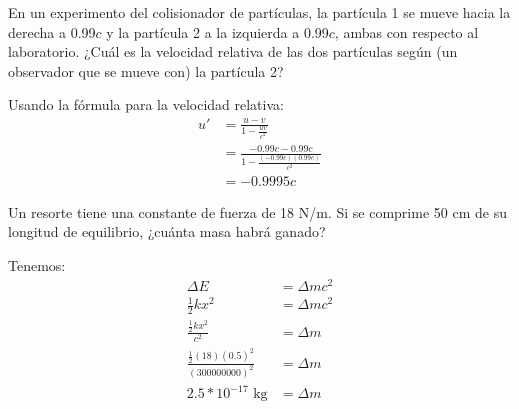 \begin{problema}
    En un experimento del colisionador de partículas, la partícula 1 se mueve hacia la derecha a 0.99$c$ y la partícula 2 a la izquierda a 0.99$c$, ambas con respecto al laboratorio. ¿Cuál es la velocidad relativa de las dos partículas según (un observador que se mueve con) la partícula 2? 
    \begin{sol}
        Usando la fórmula para la velocidad relativa: 
        \begin{align*}
            u' &=\frac{u-v}{1-\frac{uv}{c^2}}\\
            &= \frac{-0.99c-0.99c}{1-\frac{(-0.99c)(0.99c)}{c^2}}\\
            &= -0.9995c
        \end{align*}
    \end{sol}
\end{problema}

\begin{problema}
    Un resorte tiene una constante de fuerza de 18 N/m. Si se comprime 50 cm de su longitud de 
    equilibrio, ¿cuánta masa habrá ganado?
    \begin{sol}
        Tenemos: 
        \begin{align*}
            \Delta E & = \Delta m c^2\\
            \frac{1}{2}kx^2 & = \Delta m c^2\\
            \frac{\frac{1}{2}kx^2}{c^2} & = \Delta m\\
            \frac{\frac{1}{2}(18)(0.5)^2}{(300000000)^2} & = \Delta m\\
            2.5*10^{-17}\text{ kg}&= \Delta m
        \end{align*}
    \end{sol} 
\end{problema}
 



%
%

